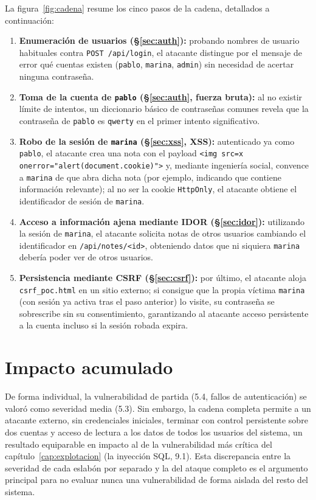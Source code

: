La figura~\ref{fig:cadena} resume los cinco pasos de la cadena,
detallados a continuación:

\begin{enumerate}
\item \textbf{Enumeración de usuarios (\S\ref{sec:auth}):} probando nombres de usuario
  habituales contra \texttt{POST /api/login}, el atacante distingue por el
  mensaje de error qué cuentas existen (\texttt{pablo}, \texttt{marina},
  \texttt{admin}) sin necesidad de acertar ninguna contraseña.
\item \textbf{Toma de la cuenta de \texttt{pablo} (\S\ref{sec:auth}, fuerza bruta):} al
  no existir límite de intentos, un diccionario básico de contraseñas
  comunes revela que la contraseña de \texttt{pablo} es \texttt{qwerty} en
  el primer intento significativo.
\item \textbf{Robo de la sesión de \texttt{marina} (\S\ref{sec:xss}, XSS):} autenticado
  ya como \texttt{pablo}, el atacante crea una nota con el payload
  \verb|<img src=x onerror="alert(document.cookie)">| y, mediante
  ingeniería social, convence a \texttt{marina} de que abra dicha nota (por
  ejemplo, indicando que contiene información relevante); al no ser la
  cookie \texttt{HttpOnly}, el atacante obtiene el identificador de sesión
  de \texttt{marina}.
\item \textbf{Acceso a información ajena mediante IDOR (\S\ref{sec:idor}):} utilizando la
  sesión de \texttt{marina}, el atacante solicita notas de otros usuarios
  cambiando el identificador en \texttt{/api/notes/<id>}, obteniendo datos
  que ni siquiera \texttt{marina} debería poder ver de otros usuarios.
\item \textbf{Persistencia mediante CSRF (\S\ref{sec:csrf}):} por último, el atacante
  aloja \texttt{csrf\_poc.html} en un sitio externo; si consigue que la
  propia víctima \texttt{marina} (con sesión ya activa tras el paso
  anterior) lo visite, su contraseña se sobrescribe sin su consentimiento,
  garantizando al atacante acceso persistente a la cuenta incluso si la
  sesión robada expira.
\end{enumerate}

\section{Impacto acumulado}

De forma individual, la vulnerabilidad de partida (5.4, fallos de
autenticación) se valoró como severidad media (5.3). Sin embargo, la cadena
completa permite a un atacante externo, sin credenciales iniciales, terminar
con control persistente sobre dos cuentas y acceso de lectura a los datos de
todos los usuarios del sistema, un resultado equiparable en impacto al de la
vulnerabilidad más crítica del capítulo~\ref{cap:explotacion} (la inyección
SQL, 9.1). Esta
discrepancia entre la severidad de cada eslabón por separado y la del ataque
completo es el argumento principal para no evaluar nunca una
vulnerabilidad de forma aislada del resto del sistema.

